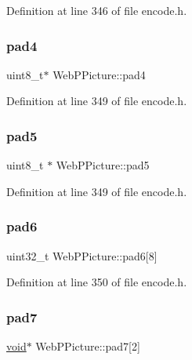 Definition at line 346 of file encode.\+h.

\mbox{\label{struct_web_p_picture_a4f96b82d72cfc58d27cc4b6a8f7df7e2}} 
\subsubsection{\texorpdfstring{pad4}{pad4}}
{\footnotesize\ttfamily uint8\+\_\+t$\ast$ Web\+P\+Picture\+::pad4}



Definition at line 349 of file encode.\+h.

\mbox{\label{struct_web_p_picture_a85e1dc0c49810c5cf94b5d5adf204b5e}} 
\subsubsection{\texorpdfstring{pad5}{pad5}}
{\footnotesize\ttfamily uint8\+\_\+t $\ast$ Web\+P\+Picture\+::pad5}



Definition at line 349 of file encode.\+h.

\mbox{\label{struct_web_p_picture_af76de31db87d32fd4de2f3d5446190cc}} 
\subsubsection{\texorpdfstring{pad6}{pad6}}
{\footnotesize\ttfamily uint32\+\_\+t Web\+P\+Picture\+::pad6\mbox{[}8\mbox{]}}



Definition at line 350 of file encode.\+h.

\mbox{\label{struct_web_p_picture_a8e8ad4f84038d65d3df5a498472b12ce}} 
\subsubsection{\texorpdfstring{pad7}{pad7}}
{\footnotesize\ttfamily \mbox{\hyperlink{_s_d_l__opengles2__gl2ext_8h_ae5d8fa23ad07c48bb609509eae494c95}{void}}$\ast$ Web\+P\+Picture\+::pad7\mbox{[}2\mbox{]}}



